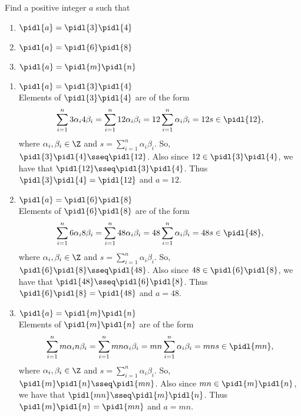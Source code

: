 \documentclass{article}
\begin{document}
Find a positive integer \( a \) such that
\begin{enumerate}[label=\tbo{\alph*.}]
  \item \( \pidl{a} = \pidl{3}\pidl{4} \)
  \item \( \pidl{a} = \pidl{6}\pidl{8} \)
  \item \( \pidl{a} = \pidl{m}\pidl{n} \)
\end{enumerate}

\begin{solution} %
\begin{enumerate}[label=\tbo{\alph*.}]
  \item \( \pidl{a} = \pidl{3}\pidl{4} \)\\
    Elements of \( \pidl{3}\pidl{4} \) are of the form \begin{align*}
      \sum_{i=1}^{n}3\alpha_i4\beta_i = \sum_{i=1}^{n}12\alpha_i\beta_i = 12\sum_{i=1}^{n}\alpha_i\beta_i = 12s \in \pidl{12},
    \end{align*}
    where \( \alpha_i,\beta_i\in \Z \) and \( s=\sum_{i=1}^{n}\alpha_i\beta_i \).
    So, \( \pidl{3}\pidl{4} \sseq \pidl{12} \).
    Also since \( 12\in \pidl{3}\pidl{4} \), we have that \( \pidl{12}\sseq \pidl{3}\pidl{4} \).
    Thus \( \pidl{3}\pidl{4} = \pidl{12} \) and \( a=12 \).
  \item \( \pidl{a} = \pidl{6}\pidl{8} \)\\
    Elements of \( \pidl{6}\pidl{8} \) are of the form \begin{align*}
      \sum_{i=1}^{n}6\alpha_i8\beta_i = \sum_{i=1}^{n}48\alpha_i\beta_i = 48\sum_{i=1}^{n}\alpha_i\beta_i = 48s \in \pidl{48},
    \end{align*} where \( \alpha_i,\beta_i\in \Z \) and \( s=\sum_{i=1}^{n}\alpha_i\beta_i \).
    So, \( \pidl{6}\pidl{8} \sseq \pidl{48} \).
    Also since \( 48\in \pidl{6}\pidl{8} \), we have that \( \pidl{48}\sseq \pidl{6}\pidl{8} \).
    Thus \( \pidl{6}\pidl{8} = \pidl{48} \) and \( a=48 \).
  \item \( \pidl{a} = \pidl{m}\pidl{n} \)\\
    Elements of \( \pidl{m}\pidl{n} \) are of the form \begin{align*}
      \sum_{i=1}^{n}m\alpha_in\beta_i = \sum_{i=1}^{n}mn\alpha_i\beta_i = mn\sum_{i=1}^{n}\alpha_i\beta_i = mn s \in \pidl{mn},
    \end{align*} where \( \alpha_i,\beta_i\in \Z \) and \( s=\sum_{i=1}^{n}\alpha_i\beta_i \).
    So, \( \pidl{m}\pidl{n}\sseq \pidl{mn} \).
    Also since \( mn\in \pidl{m}\pidl{n} \), we have that \( \pidl{mn}\sseq\pidl{m}\pidl{n} \).
    Thus \( \pidl{m}\pidl{n} = \pidl{mn} \) and \( a=mn \).
\end{enumerate}
\end{solution}
\end{document}
